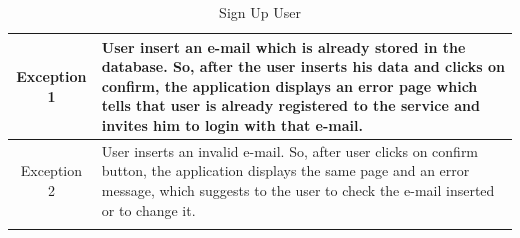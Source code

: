 \documentclass[table, 12pt]{article}
\begin{document}
\begin{longtable}{ | c | p{10cm} | }
    Exception 1      & User insert an e-mail which is already stored in the database. So, after the user inserts his data and clicks on confirm, the application displays an error page which tells that user is already registered to the service and invites him to login with that e-mail. \\
    \hline
    Exception 2      & User inserts an invalid e-mail. So, after user clicks on confirm button, the application displays the same page and an error message, which suggests to the user to check the e-mail inserted or to change it.                                                         \\
    \hline
    \caption{Sign Up User}                                                                                                                                                                                                                                                                    \\
\end{longtable}
\end{document}
